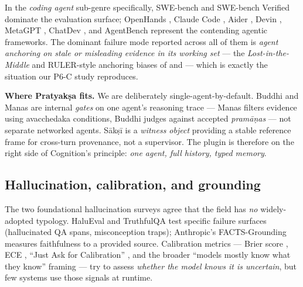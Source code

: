 In the \emph{coding agent} sub-genre specifically, SWE-bench \citep{jimenez2024swebench} and SWE-bench Verified \citep{openai2024sweverified} dominate the evaluation surface; OpenHands \citep{wang2024openhands}, Claude Code \citep{anthropic2025claudecode}, Aider \citep{aider2024}, Devin \citep{cognition2024devin}, MetaGPT \citep{hong2024metagpt}, ChatDev \citep{chen2024chatdev}, and AgentBench \citep{liu2023agentbench} represent the contending agentic frameworks. The dominant failure mode reported across all of them is \emph{agent anchoring on stale or misleading evidence in its working set} --- the \emph{Lost-in-the-Middle} and RULER-style anchoring biases of \citet{liu2023lostmiddle} and \citet{hsieh2024ruler} --- which is exactly the situation our P6-C study reproduces.

\textbf{Where Pratyakṣa fits.} We are deliberately single-agent-by-default. Buddhi and Manas are internal \emph{gates} on one agent's reasoning trace --- Manas filters evidence using avacchedaka conditions, Buddhi judges against accepted \emph{pramāṇas} --- not separate networked agents. Sākṣī is a \emph{witness object} providing a stable reference frame for cross-turn provenance, not a supervisor. The plugin is therefore on the right side of Cognition's principle: \emph{one agent, full history, typed memory}.

\subsection{Hallucination, calibration, and grounding}\label{hallucination-calibration-and-grounding}

The two foundational hallucination surveys \citep{ji2023hallusurvey, huang2024hallucinationsurvey} agree that the field has \emph{no} widely-adopted typology. HaluEval \citep{li2023halueval} and TruthfulQA \citep{lin2022truthfulqa} test specific failure surfaces (hallucinated QA spans, misconception traps); Anthropic's FACTS-Grounding \citep{anthropic2024facts} measures faithfulness to a provided source. Calibration metrics --- Brier score \citep{brier1950score}, ECE \citep{naeini2015ece, guo2017calibration}, ``Just Ask for Calibration'' \citep{tian2023justask}, and the broader ``models mostly know what they know'' framing \citep{kadavath2022know} --- try to assess \emph{whether the model knows it is uncertain}, but few systems use those signals at runtime.

